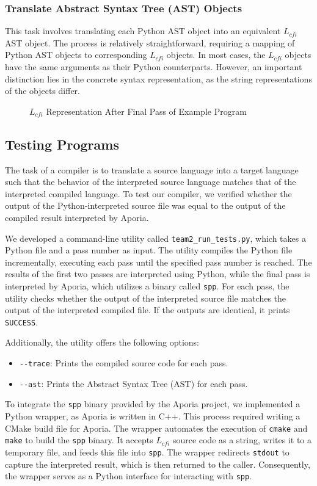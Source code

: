 \subsubsection{Translate Abstract Syntax Tree (AST) Objects}
This task involves translating each Python AST object into an equivalent $L_{cfi}$ AST object. The process is relatively straightforward, requiring a mapping of Python AST objects to corresponding $L_{cfi}$ objects. In most cases, the $L_{cfi}$ objects have the same arguments as their Python counterparts. However, an important distinction lies in the concrete syntax representation, as the string representations of the objects differ.

\begin{figure}[h!]
	
	\caption{$L_{cfi}$ Representation After Final Pass of Example Program}
	\label{code:lcfi}
\end{figure}

\subsection{Testing Programs}

The task of a compiler is to translate a source language into a target language such that the behavior of the interpreted source language matches that of the interpreted compiled language. To test our compiler, we verified whether the output of the Python-interpreted source file was equal to the output of the compiled result interpreted by Aporia.

We developed a command-line utility called \texttt{team2\_run\_tests.py}, which takes a Python file and a pass number as input. The utility compiles the Python file incrementally, executing each pass until the specified pass number is reached. The results of the first two passes are interpreted using Python, while the final pass is interpreted by Aporia, which utilizes a binary called \texttt{spp}. For each pass, the utility checks whether the output of the interpreted source file matches the output of the interpreted compiled file. If the outputs are identical, it prints \texttt{SUCCESS}.

Additionally, the utility offers the following options:
\begin{itemize}
	\item \texttt{-{}-trace}: Prints the compiled source code for each pass.
	\item \texttt{-{}-ast}: Prints the Abstract Syntax Tree (AST) for each pass.
\end{itemize}

To integrate the \texttt{spp} binary provided by the Aporia project, we implemented a Python wrapper, as Aporia is written in C++. This process required writing a CMake build file for Aporia. The wrapper automates the execution of \texttt{cmake} and \texttt{make} to build the \texttt{spp} binary. It accepts $L_{cfi}$ source code as a string, writes it to a temporary file, and feeds this file into \texttt{spp}. The wrapper redirects \texttt{stdout} to capture the interpreted result, which is then returned to the caller. Consequently, the wrapper serves as a Python interface for interacting with \texttt{spp}.

